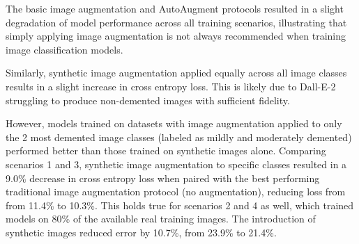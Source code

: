 \documentclass [MAS] {uclathes}
\begin{document}
The basic image augmentation and AutoAugment protocols resulted in a slight degradation of model performance across all 
training scenarios, illustrating that simply applying image augmentation is not always recommended when training image 
classification models.

Similarly, synthetic image augmentation applied equally across all image classes results in a slight increase in cross 
entropy loss. This is likely due to Dall-E-2 struggling to produce non-demented images with sufficient fidelity.

However, models trained on datasets with image augmentation applied to only the 2 most demented image classes (labeled 
as mildly and moderately demented) performed better than those trained on synthetic images alone. Comparing scenarios 1 
and 3, synthetic image augmentation to specific classes resulted in a 9.0\% decrease in cross entropy loss when paired 
with the best performing traditional image augmentation protocol (no augmentation), reducing loss from from 11.4\% to 
10.3\%. This holds true for scenarios 2 and 4 as well, which trained models on 80\% of the available real training 
images. The introduction of synthetic images reduced error by 10.7\%, from 23.9\% to 21.4\%.
\end{document}
